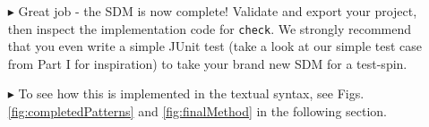 \begin{itemize}
\clearpage

\item[$\blacktriangleright$] Great job - the SDM is now complete! Validate and export your project, then inspect the implementation code for \texttt{check}. We
strongly recommend that you even write a simple JUnit test (take a look at our simple test case from Part I for inspiration) to take your brand new SDM for a
test-spin.

\item[$\blacktriangleright$] To see how this is implemented in the textual syntax, see Figs. \ref{fig:completedPatterns} and \ref{fig:finalMethod} in the
following section.


\end{itemize}
